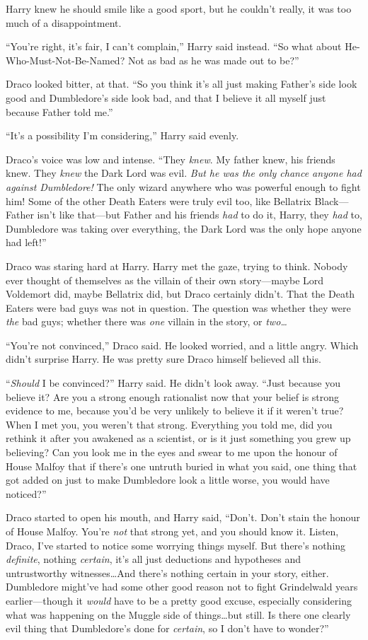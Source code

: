 Harry knew he should smile like a good sport, but he couldn’t really, it was too much of a disappointment.

“You’re right, it’s fair, I can’t complain,” Harry said instead. “So what about He-Who-Must-Not-Be-Named? Not as bad as he was made out to be?”

Draco looked bitter, at that. “So you think it’s all just making Father’s side look good and Dumbledore’s side look bad, and that I believe it all myself just because Father told me.”

“It’s a possibility I’m considering,” Harry said evenly.

Draco’s voice was low and intense. “They \emph{knew}. My father knew, his friends knew. They \emph{knew} the Dark Lord was evil. \emph{But he was the only chance anyone had against Dumbledore!} The only wizard anywhere who was powerful enough to fight him! Some of the other Death Eaters were truly evil too, like Bellatrix Black—Father isn’t like that—but Father and his friends \emph{had} to do it, Harry, they \emph{had} to, Dumbledore was taking over everything, the Dark Lord was the only hope anyone had left!”

Draco was staring hard at Harry. Harry met the gaze, trying to think. Nobody ever thought of themselves as the villain of their own story—maybe Lord Voldemort did, maybe Bellatrix did, but Draco certainly didn’t. That the Death Eaters were bad guys was not in question. The question was whether they were \emph{the} bad guys; whether there was \emph{one} villain in the story, or \emph{two…}

“You’re not convinced,” Draco said. He looked worried, and a little angry. Which didn’t surprise Harry. He was pretty sure Draco himself believed all this.

“\emph{Should} I be convinced?” Harry said. He didn’t look away. “Just because you believe it? Are you a strong enough rationalist now that your belief is strong evidence to me, because you’d be very unlikely to believe it if it weren’t true? When I met you, you weren’t that strong. Everything you told me, did you rethink it after you awakened as a scientist, or is it just something you grew up believing? Can you look me in the eyes and swear to me upon the honour of House Malfoy that if there’s one untruth buried in what you said, one thing that got added on just to make Dumbledore look a little worse, you would have noticed?”

Draco started to open his mouth, and Harry said, “Don’t. Don’t stain the honour of House Malfoy. You’re \emph{not} that strong yet, and you should know it. Listen, Draco, I’ve started to notice some worrying things myself. But there’s nothing \emph{definite}, nothing \emph{certain}, it’s all just deductions and hypotheses and untrustworthy witnesses…And there’s nothing certain in your story, either. Dumbledore might’ve had some other good reason not to fight Grindelwald years earlier—though it \emph{would} have to be a pretty good excuse, especially considering what was happening on the Muggle side of things…but still. Is there one clearly evil thing that Dumbledore’s done for \emph{certain}, so I don’t have to wonder?”

